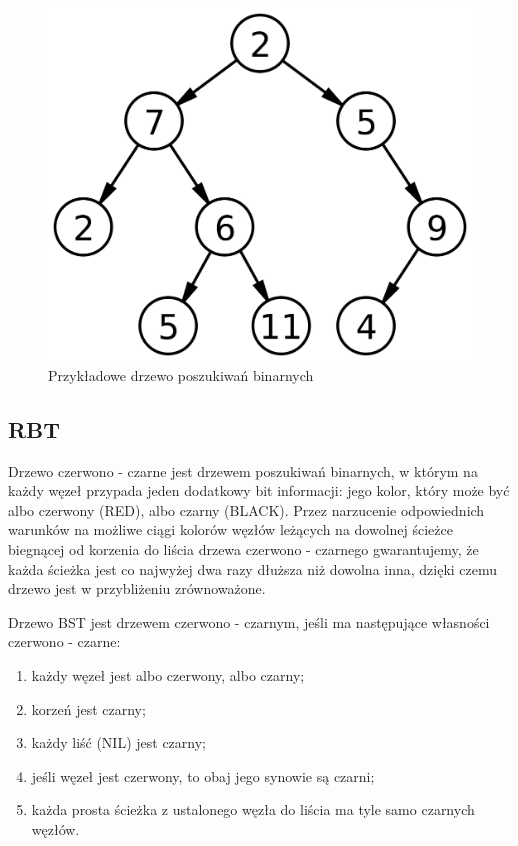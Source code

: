 \documentclass[10pt,a4paper]{article}
\theoremstyle{definition}
\theoremstyle{definition}
\theoremstyle{definition}
\begin{document}
        \begin{figure}[h]
        	\centering
        	\includegraphics[scale=0.25]{images/bst}
        	\caption{Przykładowe drzewo poszukiwań binarnych}
        	\label{fig:bst}
       	\end{figure}
        
    \subsection{RBT}
        Drzewo czerwono - czarne jest drzewem poszukiwań binarnych, w którym na każdy węzeł przypada jeden dodatkowy bit informacji: jego kolor, który może być albo czerwony (RED), albo czarny (BLACK). Przez narzucenie odpowiednich warunków na możliwe ciągi kolorów węzłów leżących na dowolnej ścieżce biegnącej od korzenia do liścia drzewa czerwono - czarnego gwarantujemy, że każda ścieżka jest co najwyżej dwa razy dłuższa niż dowolna inna, dzięki czemu drzewo jest w przybliżeniu zrównoważone.
        
        Drzewo BST jest drzewem czerwono - czarnym, jeśli ma następujące własności czerwono - czarne:
        \begin{enumerate}
            \item każdy węzeł jest albo czerwony, albo czarny;
            \item korzeń jest czarny;
            \item każdy liść (NIL) jest czarny;
            \item jeśli węzeł jest czerwony, to obaj jego synowie są czarni;
            \item każda prosta ścieżka z ustalonego węzła do liścia ma tyle samo czarnych węzłów.
        \end{enumerate}
        
\end{document}
